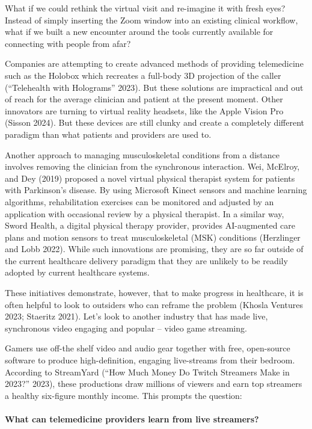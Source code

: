 \documentclass[
  letterpaper,
  DIV=11,
  numbers=noendperiod,
  oneside]{scrartcl}
\makeatletter
\let\oldparagraph\paragraph
\renewcommand{\paragraph}{
    \@ifstar
      \xxxParagraphStar
      \xxxParagraphNoStar
  }
\newcommand{\xxxParagraphStar}[1]{\oldparagraph*{#1}\mbox{}}
\newcommand{\xxxParagraphNoStar}[1]{\oldparagraph{#1}\mbox{}}
\makeatother
\begin{document}
What if we could rethink the virtual visit and re-imagine it with fresh
eyes? Instead of simply inserting the Zoom window into an existing
clinical workflow, what if we built a new encounter around the tools
currently available for connecting with people from afar?

Companies are attempting to create advanced methods of providing
telemedicine such as the Holobox which recreates a full-body 3D
projection of the caller ({``Telehealth with {Holograms}''} 2023). But
these solutions are impractical and out of reach for the average
clinician and patient at the present moment. Other innovators are
turning to virtual reality headsets, like the Apple Vision Pro (Sisson
2024). But these devices are still clunky and create a completely
different paradigm than what patients and providers are used to.

Another approach to managing musculoskeletal conditions from a distance
involves removing the clinician from the synchronous interaction. Wei,
McElroy, and Dey (2019) proposed a novel virtual physical therapist
system for patients with Parkinson's disease. By using Microsoft Kinect
sensors and machine learning algorithms, rehabilitation exercises can be
monitored and adjusted by an application with occasional review by a
physical therapist. In a similar way, Sword Health, a digital physical
therapy provider, provides AI-augmented care plans and motion sensors to
treat musculoskeletal (MSK) conditions (Herzlinger and Lobb 2022). While
such innovations are promising, they are so far outside of the current
healthcare delivery paradigm that they are unlikely to be readily
adopted by current healthcare systems.

These initiatives demonstrate, however, that to make progress in
healthcare, it is often helpful to look to outsiders who can reframe the
problem (Khosla Ventures 2023; Staeritz 2021). Let's look to another
industry that has made live, synchronous video engaging and popular --
video game streaming.

Gamers use off-the shelf video and audio gear together with free,
open-source software to produce high-definition, engaging live-streams
from their bedroom. According to StreamYard ({``How {Much Money Do
Twitch Streamers Make} in 2023?''} 2023), these productions draw
millions of viewers and earn top streamers a healthy six-figure monthly
income. This prompts the question:

\paragraph{\texorpdfstring{\textbf{What can telemedicine providers learn
from live
streamers?}}{What can telemedicine providers learn from live streamers?}}\label{what-can-telemedicine-providers-learn-from-live-streamers}
\end{document}
